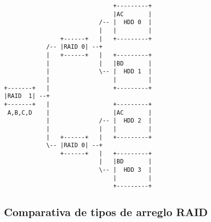 \begin{itemize}
{
\scriptsize
\linespread{1}
\begin{verbatim}
                               +---------+
                               |AC       |
                           /-- |  HDD 0  |
                           |   |         |
                +------+   |   +---------+
            /-- |RAID 0| --+
            |   +------+   |   +---------+
            |              |   |BD       |
            |              \-- |  HDD 1  |
            |                  |         |
+-------+   |                  +---------+
|RAID  1| --+
+-------+   |                  +---------+
 A,B,C,D    |                  |AC       |
            |              /-- |  HDD 2  |
            |              |   |         |
            |   +------+   |   +---------+
            \-- |RAID 0| --+
                +------+   |   +---------+
                           |   |BD       |
                           \-- |  HDD 3  |
                               |         |
                               +---------+
\end{verbatim}
}

\end{itemize}

      \subsection {Comparativa de tipos de arreglo RAID}

